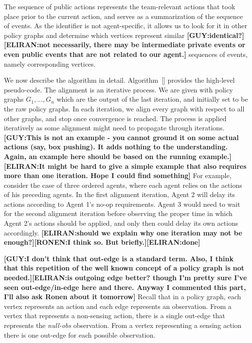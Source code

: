 \documentclass[letterpaper]{article} %
\newcommand{\eliran}[1]{\textbf{[\color{red}ELIRAN:#1]}}
\newcommand{\ronen}[1]{\textbf{[\color{blue}RONEN:#1]}}
\newcommand{\guy}[1]{\textbf{[\color{orange}GUY:#1]}}
\begin{document}
The sequence of public actions represents the team-relevant actions that took place prior to the current action, and serves as a summarization of the sequence of events. As the identifier is not agent-specific, it allows us to look for it in other policy graphs and determine which vertices represent similar \guy{identical?}\eliran{not necessarily, there may be intermediate private events or even public events that are not related to our agent.} sequences of events, namely corresponding vertices.

We now describe the algorithm in detail. Algorithm~\ref{} provides the high-level pseudo-code.
The alignment is an iterative process. We are given with policy graphs $G_1,...,G_n$ which are the output of the last iteration, and initially set to be the raw policy graphs. In each iteration, we align every graph with respect to all other graphs, and stop once convergence is reached. The process is applied iteratively as some alignment might need to propagate through iterations. 
\guy{This is not an example - you cannot ground it on some actual actions (say, box pushing). It adds nothing to the understanding. Again, an example here should be based on the running example.}\eliran{It might be hard to give a simple example that also requires more than one iteration. Hope I could find something}
For example, consider the case of three ordered agents, where each agent relies on the actions of his preceding agents. In the first alignment iteration, Agent 2 will delay its actions according to Agent 1's no-op requirements. Agent 3 would need to wait for the second alignment iteration before observing the proper time in which Agent 2's actions should be applied, and only then could delay its own actions accordingly. \eliran{should we explain why one iteration may not be enough?}\ronen{I think so. But briefly.}\eliran{done}


\guy{I don't think that out-edge is a standard term. Also, I think that this repetition of the well known concept of a policy graph is not needed.}\eliran{is outgoing edge better? though I'm pretty sure I've seen out-edge/in-edge here and there. Anyway I commented this part, I'll also ask Ronen about it tomorrow}
Recall that in a policy graph, each vertex represents an action and each edge represents an observation. From a vertex that represents a non-sensing action, there is a single out-edge that represents the \emph{null-obs} observation. From a vertex representing a sensing action there is one out-edge for each possible observation.
\end{document}
